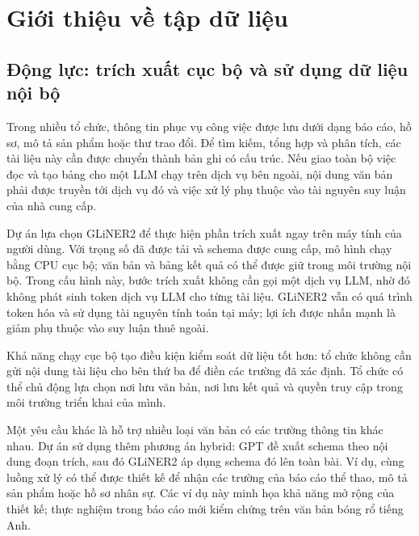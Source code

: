 \section{Giới thiệu về tập dữ liệu}
\subsection{Động lực: trích xuất cục bộ và sử dụng dữ liệu nội bộ}
Trong nhiều tổ chức, thông tin phục vụ công việc được lưu dưới dạng báo cáo, hồ sơ, mô tả sản phẩm hoặc thư trao đổi. Để tìm kiếm, tổng hợp và phân tích, các tài liệu này cần được chuyển thành bản ghi có cấu trúc. Nếu giao toàn bộ việc đọc và tạo bảng cho một LLM chạy trên dịch vụ bên ngoài, nội dung văn bản phải được truyền tới dịch vụ đó và việc xử lý phụ thuộc vào tài nguyên suy luận của nhà cung cấp.

Dự án lựa chọn GLiNER2 để thực hiện phần trích xuất ngay trên máy tính của người dùng. Với trọng số đã được tải và schema được cung cấp, mô hình chạy bằng CPU cục bộ; văn bản và bảng kết quả có thể được giữ trong môi trường nội bộ. Trong cấu hình này, bước trích xuất không cần gọi một dịch vụ LLM, nhờ đó không phát sinh token dịch vụ LLM cho từng tài liệu. GLiNER2 vẫn có quá trình token hóa và sử dụng tài nguyên tính toán tại máy; lợi ích được nhấn mạnh là giảm phụ thuộc vào suy luận thuê ngoài.

Khả năng chạy cục bộ tạo điều kiện kiểm soát dữ liệu tốt hơn: tổ chức không cần gửi nội dung tài liệu cho bên thứ ba để điền các trường đã xác định. Tổ chức có thể chủ động lựa chọn nơi lưu văn bản, nơi lưu kết quả và quyền truy cập trong môi trường triển khai của mình.

Một yêu cầu khác là hỗ trợ nhiều loại văn bản có các trường thông tin khác nhau. Dự án sử dụng thêm phương án hybrid: GPT đề xuất schema theo nội dung đoạn trích, sau đó GLiNER2 áp dụng schema đó lên toàn bài. Ví dụ, cùng luồng xử lý có thể được thiết kế để nhận các trường của báo cáo thể thao, mô tả sản phẩm hoặc hồ sơ nhân sự. Các ví dụ này minh họa khả năng mở rộng của thiết kế; thực nghiệm trong báo cáo mới kiểm chứng trên văn bản bóng rổ tiếng Anh.

